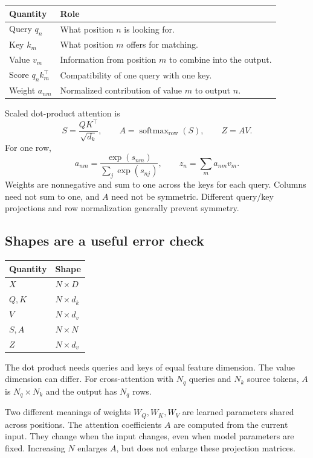 \documentclass[11pt]{article}
\begin{document}
\begin{longtable}{@{}P{.20\textwidth}P{.70\textwidth}@{}}
\toprule Quantity & Role\\\midrule\endhead
Query $q_n$ & What position $n$ is looking for.\\
Key $k_m$ & What position $m$ offers for matching.\\
Value $v_m$ & Information from position $m$ to combine into the output.\\
Score $q_nk_m^\top$ & Compatibility of one query with one key.\\
Weight $a_{nm}$ & Normalized contribution of value $m$ to output $n$.\\\bottomrule
\end{longtable}
Scaled dot-product attention is
\[
S=\frac{QK^\top}{\sqrt{d_k}},\qquad
A=\operatorname{softmax}_{\mathrm{row}}(S),\qquad Z=AV.
\]
For one row,
\[
a_{nm}=\frac{\exp(s_{nm})}{\sum_j\exp(s_{nj})},\qquad
z_n=\sum_m a_{nm}v_m.
\]
Weights are nonnegative and sum to one across the keys for each query. Columns need not sum to one, and $A$ need not be symmetric. Different query/key projections and row normalization generally prevent symmetry.

\subsection{Shapes are a useful error check}
\begin{center}
\begin{tabular}{ll}
\toprule Quantity & Shape\\\midrule
$X$ & $N\times D$\\
$Q,K$ & $N\times d_k$\\
$V$ & $N\times d_v$\\
$S,A$ & $N\times N$\\
$Z$ & $N\times d_v$\\\bottomrule
\end{tabular}
\end{center}
The dot product needs queries and keys of equal feature dimension. The value dimension can differ. For cross-attention with $N_q$ queries and $N_k$ source tokens, $A$ is $N_q\times N_k$ and the output has $N_q$ rows.

\begin{keyidea}{Two different meanings of weights}
$W_Q,W_K,W_V$ are learned parameters shared across positions. The attention coefficients $A$ are computed from the current input. They change when the input changes, even when model parameters are fixed. Increasing $N$ enlarges $A$, but does not enlarge these projection matrices.
\end{keyidea}
\end{document}
